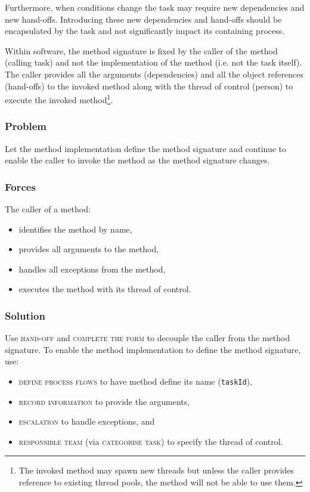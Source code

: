 \documentclass[prodmode]{style/acmlarge}
\begin{document}
Furthermore, when conditions change the task may require new dependencies and
new hand-offs.  Introducing these new dependencies and hand-offs should be
encapsulated by the task and not significantly impact its containing process.

Within software, the method signature is fixed by the caller of the method
(calling task) and not the implementation of the method (i.e. not the task
itself).  The caller provides all the arguments (dependencies) and all the
object references (hand-offs) to the invoked method along with the thread of
control (person) to execute the invoked method\footnote{The invoked method may
spawn new threads but unless the caller provides reference to existing thread
pools, the method will not be able to use them.}.

\subsubsection*{Problem} Let the method implementation define the method
signature and continue to enable the caller to invoke the method as the method
signature changes.

\subsubsection*{Forces} The caller of a method:
\begin{itemize}
  \item identifies the method by name,
  \item provides all arguments to the method,
  \item handles all exceptions from the method,
  \item executes the method with its thread of control.
\end{itemize}

\subsubsection*{Solution} Use \textsc{hand-off} and \textsc{complete the form}
to decouple the caller from the method signature.  To enable the method
implementation to define the method signature, use:
\begin{itemize}
  \item \textsc{define process flows} to have method define its name (\texttt{taskId}),
  \item \textsc{record information} to provide the arguments,
  \item \textsc{escalation} to handle exceptions, and
  \item \textsc{responsible team} (via \textsc{categorise task}) to specify the thread of control.    
\end{itemize}
\end{document}
